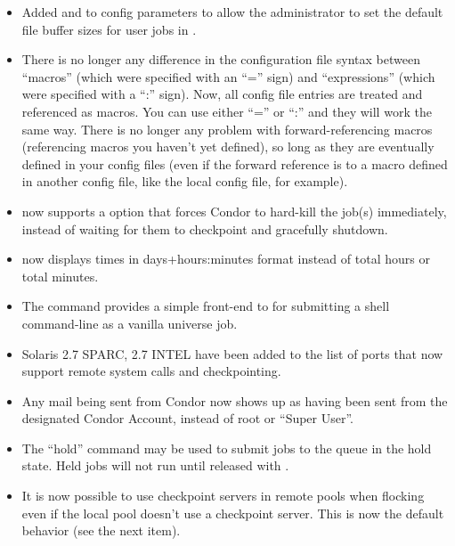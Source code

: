 \begin{itemize}

\item Added  and
 to config parameters to allow
the administrator to set the default file buffer sizes for user jobs
in .

\item There is no longer any difference in the configuration file
syntax between ``macros'' (which were specified with an ``='' sign)
and ``expressions'' (which were specified with a ``:'' sign).  
Now, all config file entries are treated and referenced as macros. 
You can use either ``='' or ``:'' and they will work the same way. 
There is no longer any problem with forward-referencing macros
(referencing macros you haven't yet defined), so long as they are
eventually defined in your config files (even if the forward reference
is to a macro defined in another config file, like the local config
file, for example).

\item {} now supports a  option that forces
Condor to hard-kill the job(s) immediately, instead of waiting for
them to checkpoint and gracefully shutdown.

\item {} now displays times in days+hours:minutes format
instead of total hours or total minutes.

\item The  command provides a simple front-end to
 for submitting a shell command-line as a vanilla
universe job.

\item Solaris 2.7 SPARC, 2.7 INTEL have been added to the
list of ports that now support remote system calls and checkpointing.

\item Any mail being sent from Condor now shows up as having been sent from
the designated Condor Account, instead of root or ``Super User''.

\item The  ``hold'' command may be used to submit jobs
to the queue in the hold state.  Held jobs will not run until released
with .

\item It is now possible to use checkpoint servers in remote pools
when flocking even if the local pool doesn't use a checkpoint server.
This is now the default behavior (see the next item).


\end{itemize}
